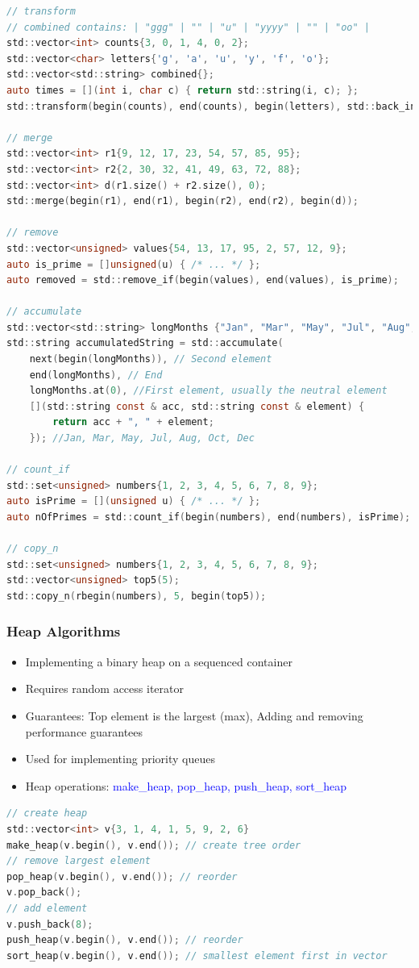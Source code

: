 \begin{lstlisting}[style=frame, style= linenumbers, language=C]
// transform
// combined contains: | "ggg" | "" | "u" | "yyyy" | "" | "oo" |
std::vector<int> counts{3, 0, 1, 4, 0, 2};
std::vector<char> letters{'g', 'a', 'u', 'y', 'f', 'o'};
std::vector<std::string> combined{};
auto times = [](int i, char c) { return std::string(i, c); };
std::transform(begin(counts), end(counts), begin(letters), std::back_inserter(combined), times);

// merge
std::vector<int> r1{9, 12, 17, 23, 54, 57, 85, 95};
std::vector<int> r2{2, 30, 32, 41, 49, 63, 72, 88};
std::vector<int> d(r1.size() + r2.size(), 0);
std::merge(begin(r1), end(r1), begin(r2), end(r2), begin(d));

// remove
std::vector<unsigned> values{54, 13, 17, 95, 2, 57, 12, 9};
auto is_prime = []unsigned(u) { /* ... */ };
auto removed = std::remove_if(begin(values), end(values), is_prime);

// accumulate
std::vector<std::string> longMonths {"Jan", "Mar", "May", "Jul", "Aug", "Oct", "Dec"};
std::string accumulatedString = std::accumulate(
    next(begin(longMonths)), // Second element
    end(longMonths), // End
    longMonths.at(0), //First element, usually the neutral element
    [](std::string const & acc, std::string const & element) {
        return acc + ", " + element;
    }); //Jan, Mar, May, Jul, Aug, Oct, Dec

// count_if
std::set<unsigned> numbers{1, 2, 3, 4, 5, 6, 7, 8, 9};
auto isPrime = [](unsigned u) { /* ... */ };
auto nOfPrimes = std::count_if(begin(numbers), end(numbers), isPrime);

// copy_n
std::set<unsigned> numbers{1, 2, 3, 4, 5, 6, 7, 8, 9};
std::vector<unsigned> top5(5);
std::copy_n(rbegin(numbers), 5, begin(top5));
\end{lstlisting}

\subsubsection{Heap Algorithms}
\begin{itemize}
    \item Implementing a binary heap on a sequenced container
    \item Requires random access iterator
    \item Guarantees: Top element is the largest (max), Adding and removing performance guarantees
    \item Used for implementing priority queues
    \item Heap operations: \textcolor{blue}{make\_heap, pop\_heap, push\_heap, sort\_heap}
\end{itemize}
\begin{lstlisting}[style=frame, style= linenumbers, language=C]
// create heap
std::vector<int> v{3, 1, 4, 1, 5, 9, 2, 6}
make_heap(v.begin(), v.end()); // create tree order
// remove largest element
pop_heap(v.begin(), v.end()); // reorder
v.pop_back();
// add element
v.push_back(8);
push_heap(v.begin(), v.end()); // reorder
sort_heap(v.begin(), v.end()); // smallest element first in vector
\end{lstlisting}

